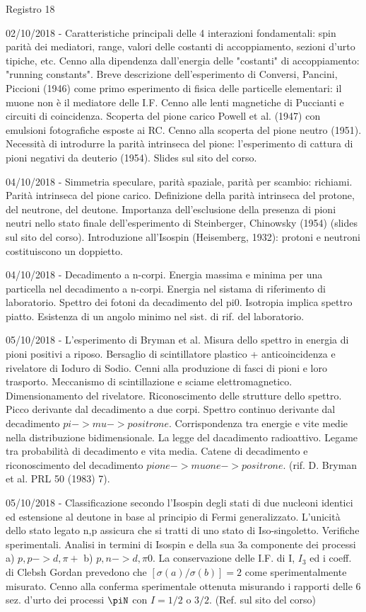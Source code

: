 \begin{frame}{Registro 18}
\begin{itemize}
{\item 02/10/2018 - Caratteristiche principali delle 4 interazioni fondamentali: spin parità dei mediatori, range, valori delle costanti di accoppiamento, sezioni d'urto tipiche, etc. Cenno alla dipendenza dall'energia delle "costanti" di accoppiamento: "running constants". Breve descrizione dell'esperimento di Conversi, Pancini, Piccioni (1946) come primo esperimento di fisica delle particelle elementari: il muone non è il mediatore delle I.F. Cenno alle lenti magnetiche di Puccianti e circuiti di coincidenza. Scoperta del pione carico Powell et al. (1947) con emulsioni fotografiche esposte ai RC. Cenno alla scoperta del pione neutro (1951). Necessità di introdurre la parità intrinseca del pione: l'esperimento di cattura di pioni negativi da deuterio (1954). Slides sul sito del corso.
\item 04/10/2018 - Simmetria speculare, parità spaziale, parità per scambio: richiami. Parità intrinseca del pione carico. Definizione della parità intrinseca del protone, del neutrone, del deutone. Importanza dell'esclusione della presenza di pioni neutri nello stato finale dell'esperimento di Steinberger, Chinowsky (1954) (slides sul sito del corso). Introduzione all'Isospin (Heisemberg, 1932): protoni e neutroni costituiscono un doppietto.
\item 04/10/2018 - Decadimento a n-corpi. Energia massima e minima per una particella nel decadimento a n-corpi. Energia nel sistama di riferimento di laboratorio. Spettro dei fotoni da decadimento del pi0. Isotropia implica spettro piatto. Esistenza di un angolo minimo nel sist. di rif. del laboratorio.
\item 05/10/2018 - L'esperimento di Bryman et al. Misura dello spettro in energia di pioni positivi a riposo. Bersaglio di scintillatore plastico + anticoincidenza e rivelatore di Ioduro di Sodio. Cenni alla produzione di fasci di pioni e loro trasporto. Meccanismo di scintillazione e sciame elettromagnetico. Dimensionamento del rivelatore. Riconoscimento delle strutture dello spettro. Picco derivante dal decadimento a due corpi. Spettro continuo derivante dal decadimento $pi -> mu -> positrone$. Corrispondenza tra energie e vite medie nella distribuzione bidimensionale. La legge del dacadimento radioattivo. Legame tra probabilità di decadimento e vita media. Catene di decadimento e riconoscimento del decadimento $pione->muone->positrone$. (rif. D. Bryman et al. PRL 50 (1983) 7).
\item 05/10/2018 - Classificazione secondo l'Isospin degli stati di due nucleoni identici ed estensione al deutone in base al principio di Fermi generalizzato. L'unicità dello stato legato n,p assicura che si tratti di uno stato di Iso-singoletto. Verifiche sperimentali. Analisi in termini di Isospin e della sua 3a componente dei processi a) $p,p->d,\pi+$ b) $p,n-> d,\pi0$. La conservazione delle I.F. di I, $I_3$ ed i coeff. di Clebsh Gordan prevedono che $[\sigma(a)/\sigma(b)]=2$ come sperimentalmente misurato. Cenno alla conferma sperimentale ottenuta misurando i rapporti delle 6 sez. d'urto dei processi $\piN$ con $I=1/2$ o $3/2$. (Ref. sul sito del corso)
}
\end{itemize}
\end{frame}
